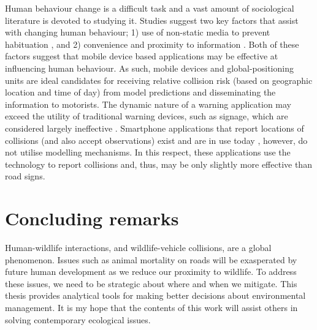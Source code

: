 Human behaviour change is a difficult task and a vast amount of sociological literature is devoted to studying it. Studies suggest two key factors that assist with changing human behaviour; 1) use of non-static media to prevent habituation \citep{}, and 2) convenience and proximity to information \citep{}. Both of these factors suggest that mobile device based applications may be effective at influencing human behaviour. As such, mobile devices and global-positioning units are ideal candidates for receiving relative collision risk (based on geographic location and time of day) from model predictions and disseminating the information to motorists. The dynamic nature of a warning application may exceed the utility of traditional warning devices, such as signage, which are considered largely ineffective \citep{}.  Smartphone applications that report locations of collisions (and also accept observations) exist and are in use today \citep{aane09}, however, do not utilise modelling mechanisms. In this respect, these applications use the technology to report collisions and, thus, may be only slightly more effective than road signs.  

\section{Concluding remarks}

Human-wildlife interactions, and wildlife-vehicle collisions, are a global phenomenon. Issues such as animal mortality on roads will be exasperated by future human development as we reduce our proximity to wildlife. To address these issues, we need to be strategic about where and when we mitigate. This thesis provides analytical tools for making better decisions about environmental management. It is my hope that the contents of this work will assist others in solving contemporary ecological issues.